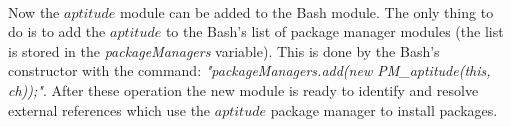 \\
Now the $aptitude$ module can be added to the Bash module.
The only thing to do is to add the $aptitude$ to the Bash's list of package manager modules (the list is stored in the \emph{packageManagers} variable).
This is done by the Bash's constructor with the command: \emph{"packageManagers.add(new PM\_aptitude(this, ch));"}. %
After these operation the new module is ready to identify and resolve external references which use the $aptitude$ package manager to install packages.